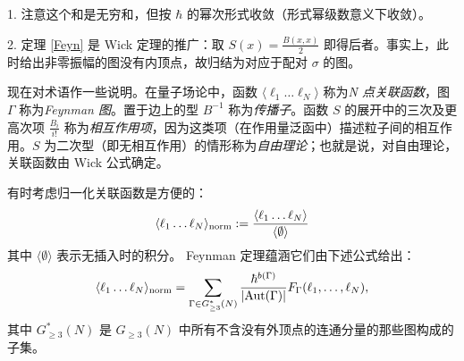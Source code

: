 \begin{remark} 1. 注意这个和是无穷和，但按 $\hbar$ 的幂次形式收敛（形式幂级数意义下收敛）。

2. 定理 \ref{Feyn} 是 Wick 定理的推广：取 $S(x)=\frac{B(x,x)}{2}$ 即得后者。事实上，此时给出非零振幅的图没有内顶点，故归结为对应于配对 $\sigma$ 的图。
\end{remark}

现在对术语作一些说明。在量子场论中，函数 $\langle\ell_1 \ldots \ell_N\rangle$ 称为\emph{N 点关联函数}，图 $\Gamma$ 称为\emph{Feynman 图}。置于边上的型 $B^{-1}$ 称为\emph{传播子}。函数 $S$ 的展开中的三次及更高次项 $\frac{B_i}{i!}$ 称为\emph{相互作用项}，因为这类项（在作用量泛函中）描述粒子间的相互作用。$S$ 为二次型（即无相互作用）的情形称为\emph{自由理论}；也就是说，对自由理论，关联函数由 Wick 公式确定。

\begin{remark}\label{G3*} 有时考虑归一化关联函数是方便的：
$$
\langle\ell_1\ldots\ell_N\rangle_{\rm norm}:=\frac{\langle\ell_1\ldots\ell_N\rangle}{\langle\emptyset\rangle}
$$
其中 $\langle\emptyset\rangle$ 表示无插入时的积分。
Feynman 定理蕴涵它们由下述公式给出：
$$
\langle\ell_1 \ldots \ell_N\rangle_{\rm norm}=
\sum_{\Gamma\in G_{\ge 3}^*(N)}\frac{\hbar^{b(\Gamma)}}{|{\rm Aut}(\Gamma)|}
F_\Gamma(\ell_1, \ldots ,\ell_N),
$$
其中 $G^*_{\ge 3}(N)$ 是 $G_{\ge 3}(N)$ 中所有不含没有外顶点的连通分量的那些图构成的子集。
\end{remark}



